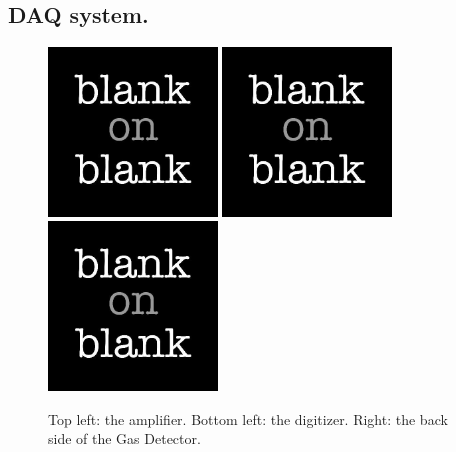 \subsection{DAQ system.}
\begin{figure}[!ht]
  \centering
  \includegraphics[width=0.4\textwidth]
  {blank.jpg}
  \includegraphics[width=0.4\textwidth]
  {blank.jpg}
  \includegraphics[width=0.4\textwidth]
  {blank.jpg}
  \caption{Top left: the amplifier. Bottom left: the digitizer. Right: the back side of the Gas Detector.}
  \label{fig: gas detector daq}
\end{figure}

